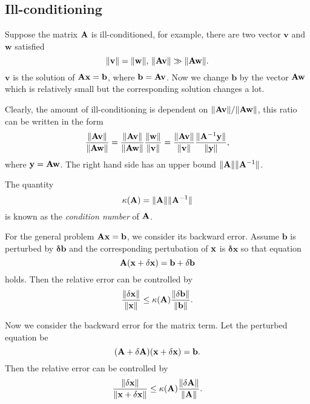 \subsection{Ill-conditioning}
\begin{exm}
    Suppose the matrix ${\mathbf{A}}$ is ill-conditioned, for example, 
    there are two vector $\mathbf{v}$ and $\mathbf{w}$ 
    satisfied
    $$
        \|\mathbf{v}\|=\|\mathbf{w}\|,\,\|{\mathbf{A}}\mathbf{v}\|
        \gg \|{\mathbf{A}}\mathbf{w}\|.
    $$ 
    $\mathbf{v}$ is the solution of ${\mathbf{A}}{\mathbf{x}}=\mathbf{b}$, where 
    $\mathbf{b}={\mathbf{A}}\mathbf{v}$. Now we change $\mathbf{b}$ by 
    the vector ${\mathbf{A}}\mathbf{w}$ which is relatively small but 
    the corresponding solution changes a lot. 

    Clearly, the amount of ill-conditioning is dependent on 
    $\|{\mathbf{A}}\mathbf{v}\|/\|{\mathbf{A}}\mathbf{w}\|$, this ratio can be 
    written in the form
    $$
        \frac{\|{\mathbf{A}}\mathbf{v}\|}{\|{\mathbf{A}}\mathbf{w}\|}=
        \frac{\|{\mathbf{A}}\mathbf{v}\|}{\|{\mathbf{A}}\mathbf{w}\|}
        \frac{\|\mathbf{w}\|}{\|\mathbf{v}\|}=
        \frac{\|{\mathbf{A}}\mathbf{v}\|}{\|\mathbf{v}\|}
        \frac{\|{\mathbf{A}}^{-1}\mathbf{y}\|}{\|\mathbf{y}\|},
    $$ 
    where $\mathbf{y}={\mathbf{A}}\mathbf{w}$. The right hand side has 
    an upper bound $\|{\mathbf{A}}\|\|{\mathbf{A}}^{-1}\|$.
\end{exm}

\begin{defn}
    The quantity
    $$
        \kappa({\mathbf{A}})=\|{\mathbf{A}}\|\|{\mathbf{A}}^{-1}\|
    $$ 
    is known as the \textit{condition number} of ${\mathbf{A}}$.
\end{defn}

\begin{thm}
    For the general problem ${\mathbf{A}}{\mathbf{x}}=\mathbf{b}$, we consider 
    its backward error. Assume $\mathbf{b}$ is perturbed by 
    $\mathbf{\delta b}$ and the corresponding pertubation of 
    ${\mathbf{x}}$ is $\mathbf{\delta x}$ so that equation
    $$
        {\mathbf{A}}({\mathbf{x}}+\mathbf{\delta x})=\mathbf{b}+\mathbf{\delta b}
    $$ 
    holds. Then the relative error can be controlled by
    $$
        \frac{\|\mathbf{\delta x}\|}{\|{\mathbf{x}}\|}\leq \kappa({\mathbf{A}})
        \frac{\|\mathbf{\delta b}\|}{\|\mathbf{b}\|}.
    $$ 
\end{thm}

\begin{thm}
    Now we consider the backward error for the matrix term. 
    Let the perturbed equation be
    $$
        ({\mathbf{A}}+\mathbf{\delta A})({\mathbf{x}}+\mathbf{\delta x})=
        \mathbf{b}.
    $$ 
    Then the relative error can be controlled by
    $$
        \frac{\|\mathbf{\delta x}\|}{\|{\mathbf{x}}+\mathbf{\delta x}\|}
        \leq \kappa({\mathbf{A}})\frac{\|\mathbf{\delta A}\|}{\|{\mathbf{A}}\|}.
    $$ 
\end{thm}

